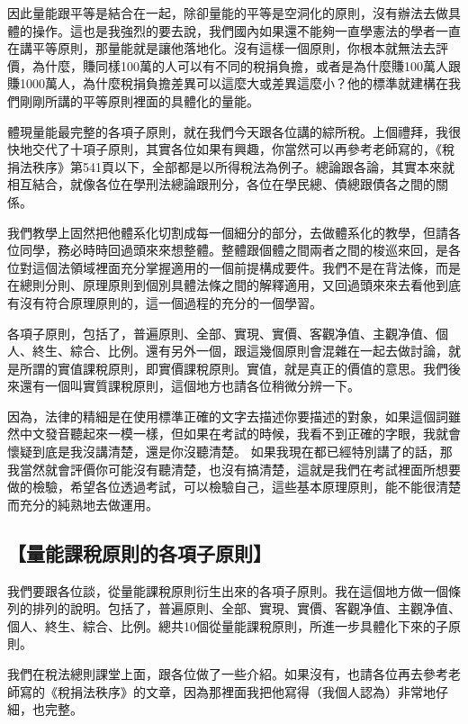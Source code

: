 \documentclass[oneside,sub3section]{ctexbook}
\begin{document}
因此量能跟平等是結合在一起，除卻量能的平等是空洞化的原則，沒有辦法去做具體的操作。這也是我強烈的要去說，我們國內如果還不能夠一直學憲法的學者一直在講平等原則，那量能就是讓他落地化。沒有這樣一個原則，你根本就無法去評價，為什麼，賺同樣100萬的人可以有不同的稅捐負擔，或者是為什麼賺100萬人跟賺1000萬人，為什麼稅捐負擔差異可以這麼大或差異這麼小？他的標準就建構在我們剛剛所講的平等原則裡面的具體化的量能。

體現量能最完整的各項子原則，就在我們今天跟各位講的綜所稅。上個禮拜，我很快地交代了十項子原則，其實各位如果有興趣，你當然可以再參考老師寫的，《稅捐法秩序》第541頁以下，全部都是以所得稅法為例子。總論跟各論，其實本來就相互結合，就像各位在學刑法總論跟刑分，各位在學民總、債總跟債各之間的關係。

我們教學上固然把他體系化切割成每一個細分的部分，去做體系化的教學，但請各位同學，務必時時回過頭來來想整體。整體跟個體之間兩者之間的梭巡來回，是各位對這個法領域裡面充分掌握適用的一個前提構成要件。我們不是在背法條，而是在總則分則、原理原則到個別具體法條之間的解釋適用，又回過頭來來去看他到底有沒有符合原理原則的，這一個過程的充分的一個學習。

各項子原則，包括了，普遍原則、全部、實現、實價、客觀净值、主觀净值、個人、終生、綜合、比例。還有另外一個，跟這幾個原則會混雜在一起去做討論，就是所謂的實值課稅原則，即實價課稅原則。實值，就是真正的價值的意思。我們後來還有一個叫實質課稅原則，這個地方也請各位稍微分辨一下。

因為，法律的精細是在使用標準正確的文字去描述你要描述的對象，如果這個詞雖然中文發音聽起來一模一樣，但如果在考試的時候，我看不到正確的字眼，我就會懷疑到底是我沒講清楚，還是你沒聽清楚。
如果我現在都已經特別講了的話，那我當然就會評價你可能沒有聽清楚，也沒有搞清楚，這就是我們在考試裡面所想要做的檢驗，希望各位透過考試，可以檢驗自己，這些基本原理原則，能不能很清楚而充分的純熟地去做運用。

\hypertarget{ux91cfux80fdux8ab2ux7a05ux539fux5247ux7684ux5404ux9805ux5b50ux539fux5247}{%
\subsection{【量能課稅原則的各項子原則】}\label{ux91cfux80fdux8ab2ux7a05ux539fux5247ux7684ux5404ux9805ux5b50ux539fux5247}}

我們要跟各位談，從量能課稅原則衍生出來的各項子原則。我在這個地方做一個條列的排列的說明。包括了，普遍原則、全部、實現、實價、客觀净值、主觀净值、個人、終生、綜合、比例。總共10個從量能課稅原則，所進一步具體化下來的子原則。

我們在稅法總則課堂上面，跟各位做了一些介紹。如果沒有，也請各位再去參考老師寫的《稅捐法秩序》的文章，因為那裡面我把他寫得（我個人認為）非常地仔細，也完整。
\end{document}
